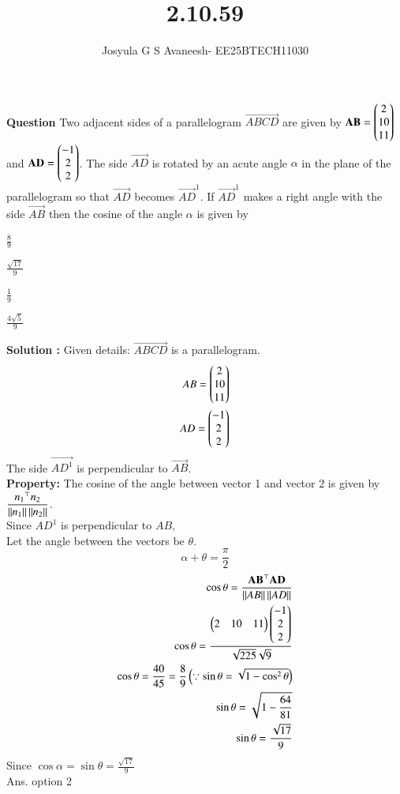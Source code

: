 \documentclass[journal]{IEEEtran}
\theoremstyle{remark}
\begin{document}

\onecolumn

\title{2.10.59}
\author{Josyula G S Avaneesh- EE25BTECH11030}
\maketitle


\renewcommand{\thefigure}{\theenumi}
\renewcommand{\thetable}{\theenumi}
\textbf{Question} Two adjacent sides of a parallelogram $\vec{ABCD}$ are given by $\mathbf{AB}=\begin{pmatrix}2\\10\\11\end{pmatrix}$ and $\mathbf{AD}=\begin{pmatrix}-1\\2\\2\end{pmatrix}$. The side $\vec{AD}$ is rotated by an acute angle $\alpha$ in the plane of the parallelogram so that $\vec{AD}$ becomes $\vec{AD}^1$. If $\vec{AD}^1$ makes a right angle with the side $\vec{AB}$ then the cosine of the angle $\alpha$ is given by\\
\begin{enumerate}
\begin{multicols}{2}
    \item $\frac{8}{9}$
    \item $\frac{\sqrt{17}}{9}$
    \item $\frac{1}{9}$
    \item $\frac{4 \sqrt{5}}{9}$
\end{multicols}
\end{enumerate}
\textbf{Solution :} Given details:
$\vec{ABCD}$ is a parallelogram.
\begin{align}
   AB=\begin{pmatrix}2\\10\\11\end{pmatrix}\\
   AD=\begin{pmatrix}-1\\2\\2\end{pmatrix}
\end{align}
The side $\vec{AD^1}$ is perpendicular to $\vec{AB}$.\\
\textbf{Property:} The cosine of the angle between vector 1 and vector 2 is given by $\dfrac{{n_1}^\top n_2}{\left\lVert n_1\right\rVert\left\lVert n_2\right\rVert} $.\\
Since $AD^1$ is perpendicular to $AB$,\\


Let the angle between the vectors be $\theta$.
$$\alpha+\theta=\frac{\pi}{2}$$
\begin{align}
  \cos\theta=\frac{\mathbf{AB}^\top\mathbf{AD}}{\left\lVert AB\right\rVert\left\lVert AD\right\rVert}\\
  \cos\theta=\frac{\begin{pmatrix}2&10&11\end{pmatrix}\begin{pmatrix}-1\\2\\2\end{pmatrix}}{\sqrt{225}\sqrt{9}}\\
  \cos\theta=\frac{40}{45}=\frac{8}{9}\left(\because\sin\theta=\sqrt{1-\cos^2\theta}\right)\\
  \sin\theta=\sqrt{1-\frac{64}{81}}\\
  \sin\theta=\frac{\sqrt{17}}{9}
\end{align}
Since $\cos\alpha=\sin\theta=\frac{\sqrt{17}}{9}$\\
Ans. option 2
\end{document}
